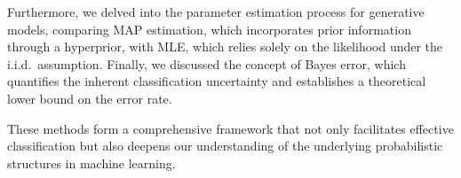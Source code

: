 \documentclass[12pt]{article}
\begin{document}
Furthermore, we delved into the parameter estimation process for generative models, comparing MAP estimation, which incorporates prior information through a hyperprior, with MLE, which relies solely on the likelihood under the i.i.d.\ assumption. Finally, we discussed the concept of Bayes error, which quantifies the inherent classification uncertainty and establishes a theoretical lower bound on the error rate.

These methods form a comprehensive framework that not only facilitates effective classification but also deepens our understanding of the underlying probabilistic structures in machine learning.
\end{document}
